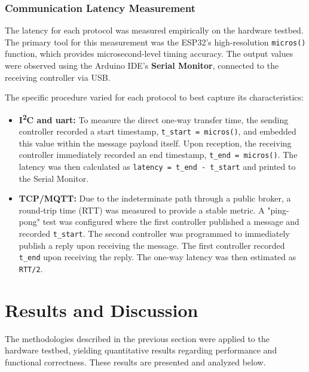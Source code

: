 \subsubsection{Communication Latency Measurement}
\label{subsubsec:latency_methodology}

The latency for each protocol was measured empirically on the hardware testbed. The primary tool for this measurement was the ESP32's high-resolution \texttt{micros()} function, which provides microsecond-level timing accuracy. The output values were observed using the Arduino IDE's \textbf{Serial Monitor}, connected to the receiving controller via USB.

The specific procedure varied for each protocol to best capture its characteristics:
\begin{itemize}
    \item \textbf{I\textsuperscript{2}C and \gls{uart}:} To measure the direct one-way transfer time, the sending controller recorded a start timestamp, \texttt{t\_start = micros()}, and embedded this value within the message payload itself. Upon reception, the receiving controller immediately recorded an end timestamp, \texttt{t\_end = micros()}. The latency was then calculated as \texttt{latency = t\_end - t\_start} and printed to the Serial Monitor.

    \item \textbf{TCP/MQTT:} Due to the indeterminate path through a public broker, a round-trip time (RTT) was measured to provide a stable metric. A "ping-pong" test was configured where the first controller published a message and recorded \texttt{t\_start}. The second controller was programmed to immediately publish a reply upon receiving the message. The first controller recorded \texttt{t\_end} upon receiving the reply. The one-way latency was then estimated as \texttt{RTT/2}.
\end{itemize}

\section{Results and Discussion}
\label{sec:results_and_discussion}

The methodologies described in the previous section were applied to the hardware testbed, yielding quantitative results regarding performance and functional correctness. These results are presented and analyzed below.

